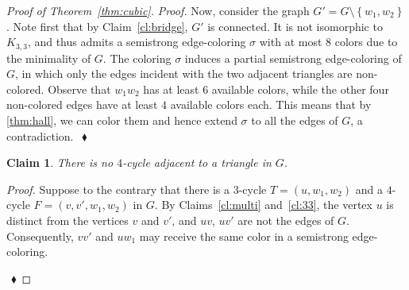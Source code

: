 \documentclass[12pt,a4paper]{article}
\newtheorem{claim}{Claim}
\newcommand{\set}[1]{\ensuremath{\left\{#1 \right\}}}
\newcommand{\chiss}[1]{\ensuremath{\chi_{\mathrm{ss}}'(#1)}}
\newenvironment{proofclaim}[1][]%
    {\noindent \emph{Proof.} {}{#1}{}}{$~$\hfill $~\blacklozenge$ \vspace{0.2cm}}
\begin{document}
\begin{proof}[Proof of Theorem~\ref{thm:cubic}]
\begin{proofclaim}
		Now, consider the graph $G' = G \setminus \set{w_1,w_2}$. 
		Note first that by Claim~\ref{cl:bridge}, $G'$ is connected.
		It is not isomorphic to $K_{3,3}$, and thus admits a semistrong edge-coloring $\sigma$ with at most $8$ colors due to the minimality of $G$.
		The coloring $\sigma$ induces a partial semistrong edge-coloring of $G$, 
		in which only the edges incident with the two adjacent triangles are non-colored.
		Observe that $w_1w_2$ has at least $6$ available colors, while the other four non-colored edges have at least $4$ available colors each.
		This means that by \cref{thm:hall}, we can color them and hence extend $\sigma$ to all the edges of $G$, a contradiction.
%		
	\end{proofclaim}	

	\begin{claim}
		\label{cl:34}
		There is no $4$-cycle adjacent to a triangle in $G$.
	\end{claim}
	
	\begin{proofclaim}
		Suppose to the contrary that there is a $3$-cycle $T=(u,w_1,w_2)$ and a $4$-cycle $F=(v,v',w_1,w_2)$ in $G$.
		By Claims~\ref{cl:multi} and~\ref{cl:33}, the vertex $u$ is distinct from the vertices $v$ and $v'$,
		and $uv$, $uv'$ are not the edges of $G$.
		Consequently, $vv'$ and $uw_1$ may receive the same color in a semistrong edge-coloring.
		

\end{proofclaim}
\end{proof}
\end{document}
